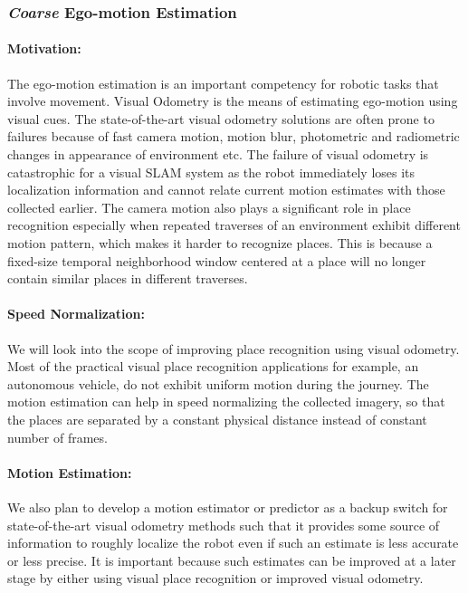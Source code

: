 \documentclass{article}
\begin{document}

\subsubsection{\emph{Coarse} Ego-motion Estimation}
\paragraph{Motivation:}The ego-motion estimation is an important competency for robotic tasks that involve movement. Visual Odometry is the means of estimating ego-motion using visual cues. The state-of-the-art visual odometry solutions are often prone to failures because of fast camera motion, motion blur, photometric and radiometric changes in appearance of environment etc. The failure of visual odometry is catastrophic for a visual SLAM system as the robot immediately loses its localization information and cannot relate current motion estimates with those collected earlier. The camera motion also plays a significant role in place recognition especially when repeated traverses of an environment exhibit different motion pattern, which makes it harder to recognize places. This is because a fixed-size temporal neighborhood window centered at a place will no longer contain similar places in different traverses.

\paragraph{Speed Normalization:}We will look into the scope of improving place recognition using visual odometry. Most of the practical visual place recognition applications for example, an autonomous vehicle, do not exhibit uniform motion during the journey. The motion estimation can help in speed normalizing the collected imagery, so that the places are separated by a constant physical distance instead of constant number of frames.

\paragraph{Motion Estimation:}We also plan to develop a motion estimator or predictor as a backup switch for state-of-the-art visual odometry methods such that it provides some source of information to roughly localize the robot even if such an estimate is less accurate or less precise. It is important because such estimates can be improved at a later stage by either using visual place recognition or improved visual odometry.
\end{document}
